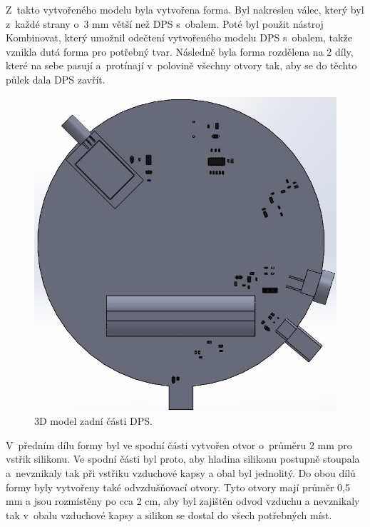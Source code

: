 Z~takto vytvořeného modelu byla vytvořena forma. Byl nakreslen válec, který byl z~každé strany o~3 mm větší než DPS s~obalem. Poté byl použit nástroj Kombinovat, který umožnil odečtení vytvořeného 
modelu DPS s~obalem, takže vznikla dutá forma pro potřebný tvar. Následně byla forma rozdělena na 2 díly, které na sebe pasují a~protínají v~polovině všechny otvory tak, aby se do těchto půlek 
dala DPS zavřít.

\begin{figure}[!h]
  \begin{center}
    \includegraphics[scale=0.4]{obrazky/3D_model_zadni.jpg}
  \end{center}
  \caption[3D model zadní části DPS]{3D model zadní části DPS.}
\end{figure}

V~předním dílu formy byl ve spodní části vytvořen otvor o~průměru 2 mm pro vstřik silikonu. Ve spodní části byl proto, aby hladina silikonu postupně stoupala a~nevznikaly tak při vstřiku vzduchové 
kapsy a obal byl jednolitý. Do obou dílů formy byly vytvořeny také odvzdušňovací otvory. Tyto otvory mají průměr 0,5 mm a jsou rozmístěny po cca 2 cm, aby byl zajištěn odvod vzduchu a nevznikaly tak 
v~obalu vzduchové kapsy a silikon se dostal do všech potřebných míst. 

